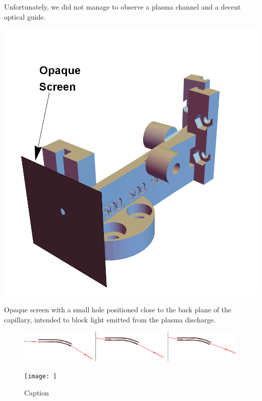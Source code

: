 \documentclass[../main.tex]{subfiles}
\begin{document}
Unfortunately, we did not manage to observe a plasma channel and a decent optical guide.
\begin{marginfigure}
\includegraphics[width=\marginparwidth]{figures/cad/opaquescreen.png}
\caption{Opaque screen with a small hole positioned close to the back plane of the capillary, intended to block light emitted from the plasma discharge.}
\label{fig:opaque}
\end{marginfigure}
\begin{figure}
    \centering
    \includegraphics[width=\textwidth]{figures/Curved capillaries/inner-refractions.pdf}
    \caption{}
    \label{fig:my_label}
\end{figure}
\begin{figure}
    \centering
    \texttt{[image: ]}
    \caption{Caption}
    \label{fig:my_label}
\end{figure}
\end{document}

